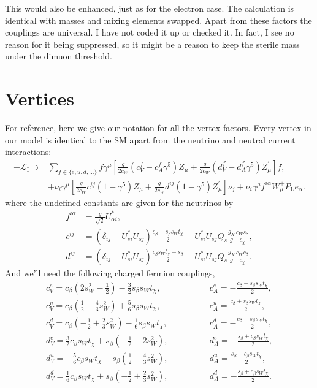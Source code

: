 \documentclass[11pt, a4paper]{article}
\begin{document}
This would also be enhanced, just as for the electron case. The calculation is
identical with masses and mixing elements swapped. Apart from these factors the
couplings are universal. I have not coded it up or checked it. In fact, I see
no reason for it being suppressed, so it might be a reason to keep the sterile
mass under the dimuon threshold.


\appendix
\newpage
\section{\label{app:vertices}Vertices}

For reference, here we give our notation for all the vertex factors. Every
vertex in our model is identical to the SM apart from the neutrino and neutral
current interactions:
%
\begin{align*}  
%
-\mathcal{L}_\text{I} \supset &\sum_{f\in\{e,u,d,\dots\}}
\overline{f}\gamma^\mu \left[
\frac{g}{2c_W}\left(c^f_V-c^f_A\gamma^5\right)Z_\mu  +
\frac{g}{2c_W}\left(d^f_V-d^f_A\gamma^5\right)Z^\prime_\mu \right]f, \\
%
&+\overline{\nu}_i\gamma^\mu \left[
\frac{g}{2c_W}c^{ij}\left(1-\gamma^5\right)Z_\mu  +
\frac{g}{2c_W}d^{ij}\left(1-\gamma^5\right)Z^\prime_\mu \right] \nu_j +
\overline{\nu_i}\gamma^\mu f^{i\alpha}W^+_\mu P_\text{L} e_\alpha. 
%
\end{align*}
%
where the undefined constants are given for the neutrinos by
%
\begin{align*}
%
f^{i\alpha} &= \frac{g}{\sqrt{2}}U^*_{\alpha i}, \\
%
c^{ij} &= \left(\delta_{ij} - U^*_{si}U_{sj}\right)\frac{c_\beta - s_\beta s_W
t_\chi}{2} - U^*_{si}U_{sj}Q_s \frac{g_X}{g}\frac{c_W s_\beta}{c_\chi}, \\
d^{ij} &= \left(\delta_{ij} - U^*_{si}U_{sj}\right)\frac{c_\beta s_W t_\chi +
s_\beta}{2} + U^*_{si}U_{sj}Q_s \frac{g_X}{g}\frac{c_W c_\beta}{c_\chi}.
\end{align*}
%
And we'll need the following charged fermion couplings,
%
\begin{align*} c^e_V = c_\beta \left(2s_W^2-\frac{1}{2}\right) -
\frac{3}{2}s_\beta s_W t_\chi, \qquad&\qquad c^e_A = -\frac{c_\beta - s_\beta
s_W t_\chi}{2}, \\
%
c^u_V = c_\beta \left(\frac{1}{2}-\frac{4}{3}s_W^2\right) + \frac{5}{6}s_\beta
s_W t_\chi,\qquad&\qquad c^u_A = \frac{c_\beta + s_\beta s_W t_\chi}{2}, \\
%
c^d_V = c_\beta \left(-\frac{1}{2}+\frac{2}{3}s_W^2\right) - \frac{1}{6}s_\beta
s_W t_\chi, \qquad&\qquad c^d_A = -\frac{c_\beta + s_\beta s_W t_\chi}{2}, \\
%
d^e_V = \frac{3}{2}c_\beta s_Wt_\chi + s_\beta\left(-\frac{1}{2} -
2s^2_W\right), \qquad&\qquad d^e_A = -\frac{s_\beta + c_\beta s_W t_\chi}{2},
\\
%
d^u_V = -\frac{5}{6}c_\beta s_Wt_\chi + s_\beta\left(\frac{1}{2} -
\frac{4}{3}s^2_W\right),\qquad&\qquad d^u_A = \frac{s_\beta + c_\beta s_W
t_\chi}{2}, \\
%
d^d_V = \frac{1}{6}c_\beta s_Wt_\chi + s_\beta\left(-\frac{1}{2} +
\frac{2}{3}s^2_W\right),\qquad & \qquad d^d_A = -\frac{s_\beta + c_\beta s_W
t_\chi}{2}.
%
\end{align*}
\end{document}
